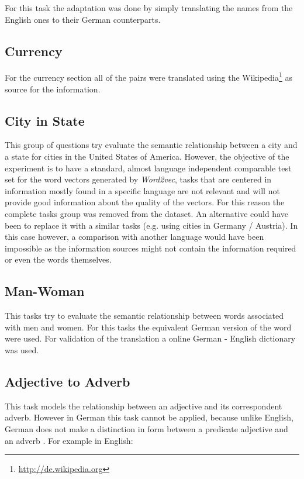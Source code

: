 For this task the adaptation was done by simply translating the names from
the English ones to their German counterparts. 

\subsection{Currency}
\label{sec:sub_sec_currency}
For the currency section all of the pairs were translated using the Wikipedia\footnote{\url{http://de.wikipedia.org}}
as source for the information. 

\subsection{City in State}
\label{sec:sub_sec_city_in_state}
This group of questions try evaluate the semantic relationship between a city
and a state for cities in the United States of America.  However, the
objective of the experiment is to have a standard,  almost
language independent comparable test set for the word vectors generated by \textit{Word2vec}, tasks that
are centered in information mostly found in a specific language are not relevant and
will not provide good information about the quality of the vectors. For this
reason the complete tasks group was removed from the dataset. An alternative could have been to replace it with a similar
tasks (e.g. using cities in Germany / Austria). In this case however, a
comparison with another language would have been impossible as the
information sources might not contain the  information required or even the words
themselves.

\subsection{Man-Woman}
\label{sec:sub_sec_man_woman}
This tasks try to evaluate the semantic relationship between words associated
with men and women. For this tasks the equivalent German version of the word
were used. For validation of the translation  a online German - English
dictionary was used.

\subsection{Adjective to Adverb}
\label{sec:sub_sec_adjetive_adverb}
This task models the relationship between an adjective and its correspondent
adverb. However in German this task cannot be applied,  because unlike English,
German does not make a distinction in form between a predicate adjective and
an adverb \cite{durrell2011hammer}. For example in English:

